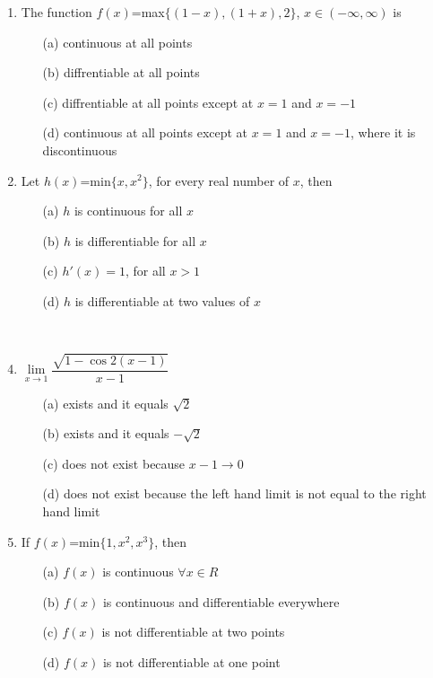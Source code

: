 \begin{enumerate}[label=\arabic*.,ref=\thesubsection.\theenumi]
\item The function $f(x)$=max$\{(1-x),(1+x),2\}$, $x \in(-\infty,\infty)$ is
\begin{itemize}
\item[(a)] continuous at all points
\item[(b)] diffrentiable at all points
\item[(c)] diffrentiable at all points except at $x=1$ and $x=-1$
\item[(d)] continuous at all points except at $x=1$ and $x=-1$, where it is discontinuous\\
\end{itemize}

\item Let $h(x)$=min$\{x,x^2\}$, for every real number of $x$, then
\begin{itemize}
\item[(a)] $h$ is continuous for all $x$
\item[(b)] $h$ is differentiable for all $x$
\item[(c)] $h'(x)=1$, for all $x>1$
\item[(d)] $h$ is differentiable at two values of $x$
\end{itemize}

\item[~] \item $\lim\limits_{x \to 1}\dfrac{\sqrt{1-\cos 2(x-1)}}{x-1}$
\begin{itemize}
\item[(a)] exists and it equals $\sqrt{2}$
\item[(b)] exists and it equals $-\sqrt{2}$
\item[(c)] does not exist because $x-1 \to 0$
\item[(d)] does not exist because the left hand limit is not equal to the right hand limit\\
\end{itemize}

\item If $f(x)$=min$\{1,x^2,x^3\}$, then
\begin{itemize}
\item[(a)] $f(x)$ is continuous $\forall x \in R$
\item[(b)] $f(x)$ is continuous and differentiable everywhere
\item[(c)] $f(x)$ is not differentiable at two points
\item[(d)] $f(x)$ is not differentiable at one point
\end{itemize}


\end{enumerate}
